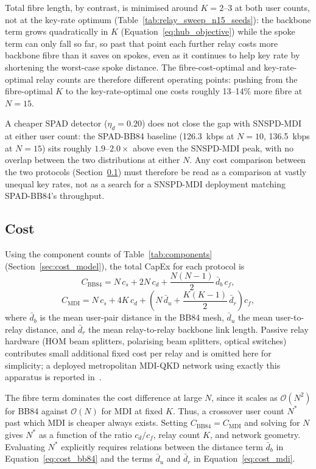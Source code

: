 \documentclass[12pt]{article}
\begin{document}
Total fibre length, by contrast, is minimised around $K=2$--3 at both user counts, not at the key-rate optimum (Table~\ref{tab:relay_sweep_n15_seeds}): the backbone term grows quadratically in $K$ (Equation~\ref{eq:hub_objective}) while the spoke term can only fall so far, so past that point each further relay costs more backbone fibre than it saves on spokes, even as it continues to help key rate by shortening the worst-case spoke distance. The fibre-cost-optimal and key-rate-optimal relay counts are therefore different operating points: pushing from the fibre-optimal $K$ to the key-rate-optimal one costs roughly 13--14\% more fibre at $N=15$.

A cheaper SPAD detector ($\eta_d=0.20$) does not close the gap with SNSPD-MDI at either user count: the SPAD-BB84 baseline (126.3~kbps at $N=10$, 136.5~kbps at $N=15$) sits roughly $1.9$--$2.0\times$ above even the SNSPD-MDI peak, with no overlap between the two distributions at either $N$. Any cost comparison between the two protocols (Section~\ref{sec:results_cost}) must therefore be read as a comparison at vastly unequal key rates, not as a search for a SNSPD-MDI deployment matching SPAD-BB84's throughput.

\subsection{Cost}
\label{sec:results_cost}

Using the component counts of Table~\ref{tab:components} (Section~\ref{sec:cost_model}), the total CapEx for each protocol is
\begin{equation}
  C_\text{BB84} = N\,c_s + 2N\,c_d + \frac{N(N-1)}{2}\,\bar{d}_b\,c_f,
    \label{eq:cost_bb84}
\end{equation}
\begin{equation}
  C_\text{MDI} = N\,c_s + 4K\,c_d + \left(N\,\bar{d}_u + \frac{K(K-1)}{2}\,\bar{d}_r\right) c_f,
    \label{eq:cost_mdi}
\end{equation}
where $\bar{d}_b$ is the mean user-pair distance in the BB84 mesh, $\bar{d}_u$ the mean user-to-relay distance, and $\bar{d}_r$ the mean relay-to-relay backbone link length. Passive relay hardware (HOM beam splitters, polarising beam splitters, optical switches) contributes small additional fixed cost per relay and is omitted here for simplicity; a deployed metropolitan MDI-QKD network using exactly this apparatus is reported in~\cite{Tang_2016}.

The fibre term dominates the cost difference at large $N$, since it scales as $\mathcal{O}(N^2)$ for BB84 against $\mathcal{O}(N)$ for MDI at fixed $K$. Thus, a crossover user count $N^*$ past which MDI is cheaper always exists. Setting $C_\text{BB84} = C_\text{MDI}$ and solving for $N$ gives $N^*$ as a function of the ratio $c_d/c_f$, relay count $K$, and network geometry. Evaluating $N^*$ explicitly requires relations between the distance term $\bar d_b$ in Equation~\ref{eq:cost_bb84} and the terms $\bar d_u$ and $\bar d_r$ in Equation~\ref{eq:cost_mdi}.
\end{document}
